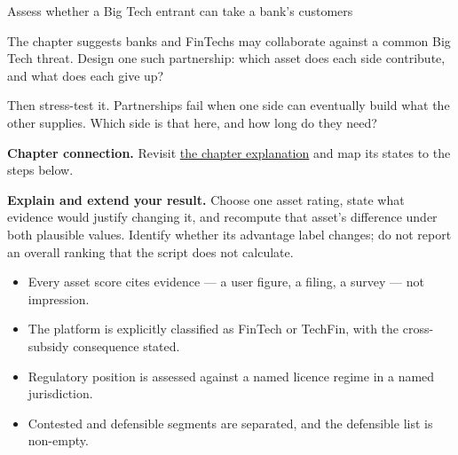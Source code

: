 \begin{labproject}{Assess whether a Big Tech entrant can take a bank's customers}
\begin{tryit}
The chapter suggests banks and FinTechs may collaborate against a common Big Tech threat. Design one such partnership: which asset does each side contribute, and what does each give up?

Then stress-test it. Partnerships fail when one side can eventually build what the other supplies. Which side is that here, and how long do they need?
\end{tryit}
\end{labproject}

\textbf{Chapter connection.} Revisit \hyperref[ch:bigtech]{the chapter explanation} and map its states to the steps below.


\begin{verification}
\textbf{Explain and extend your result.} Choose one asset rating, state what evidence would justify changing it, and recompute that asset's difference under both plausible values. Identify whether its advantage label changes; do not report an overall ranking that the script does not calculate.


\begin{itemize}
  \item Every asset score cites evidence --- a user figure, a filing, a survey --- not impression.
  \item The platform is explicitly classified as FinTech or TechFin, with the cross-subsidy consequence stated.
  \item Regulatory position is assessed against a named licence regime in a named jurisdiction.
  \item Contested and defensible segments are separated, and the defensible list is non-empty.
\end{itemize}
\end{verification}
